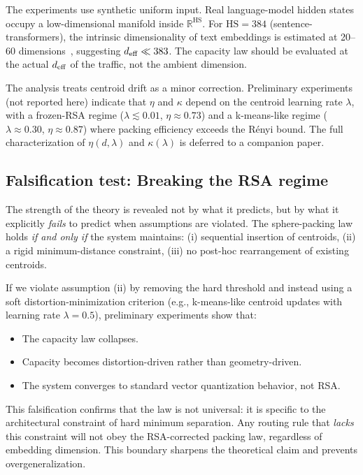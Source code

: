 \documentclass[11pt]{article}
\begin{document}
The experiments use synthetic uniform input.
Real language-model hidden states occupy a low-dimensional manifold inside
$\mathbb{R}^{\mathrm{HS}}$.
For $\mathrm{HS}=384$ (sentence-transformers), the intrinsic dimensionality
of text embeddings is estimated at 20--60 dimensions~\cite{intrinsic_dim},
suggesting $d_{\rm eff} \ll 383$.
The capacity law should be evaluated at the actual $d_{\rm eff}$ of the
traffic, not the ambient dimension.

The analysis treats centroid drift as a minor correction.
Preliminary experiments (not reported here) indicate that $\eta$ and $\kappa$
depend on the centroid learning rate $\lambda$, with a frozen-RSA regime
($\lambda \lesssim 0.01$, $\eta \approx 0.73$) and a k-means-like regime
($\lambda \approx 0.30$, $\eta \approx 0.87$) where packing efficiency
exceeds the Rényi bound.
The full characterization of $\eta(d, \lambda)$ and $\kappa(\lambda)$
is deferred to a companion paper.

\subsection{Falsification test: Breaking the RSA regime}

The strength of the theory is revealed not by what it predicts, but by what it
explicitly \emph{fails} to predict when assumptions are violated.
The sphere-packing law holds \emph{if and only if} the system maintains:
(i) sequential insertion of centroids,
(ii) a rigid minimum-distance constraint,
(iii) no post-hoc rearrangement of existing centroids.

If we violate assumption (ii) by removing the hard threshold and instead using
a soft distortion-minimization criterion (e.g., k-means-like centroid updates
with learning rate $\lambda = 0.5$), preliminary experiments show that:
\begin{itemize}
  \item The capacity law collapses.
  \item Capacity becomes distortion-driven rather than geometry-driven.
  \item The system converges to standard vector quantization behavior, not RSA.
\end{itemize}

This falsification confirms that the law is not universal: it is specific to
the architectural constraint of hard minimum separation.
Any routing rule that \emph{lacks} this constraint will not obey the
RSA-corrected packing law, regardless of embedding dimension.
This boundary sharpens the theoretical claim and prevents overgeneralization.
\end{document}
